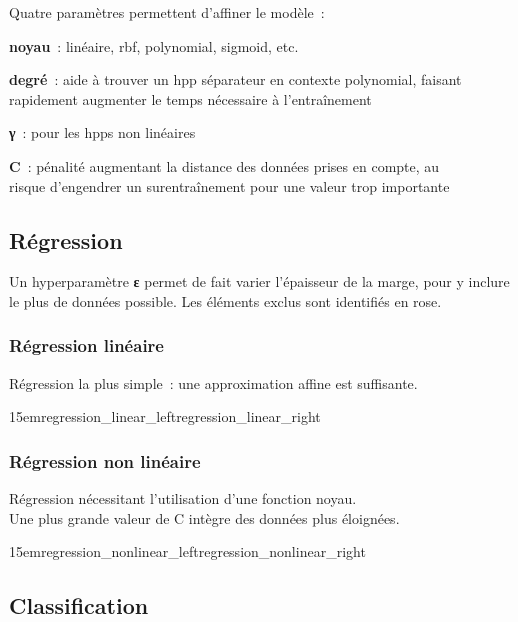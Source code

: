 Quatre paramètres permettent d’affiner le modèle :
\begin{itmz}
\item{\textbf{noyau} : linéaire, \gls{rbf}, polynomial, \gls{sigmoid}, etc.}
\item{\textbf{degré} : aide à trouver un \gls{hpp} séparateur en contexte polynomial,
faisant rapidement augmenter le temps nécessaire à l’entraînement}
\item{\textbf{γ} : pour les \glspl{hpp} non linéaires}
\item{\textbf{C} : pénalité augmentant la distance des données prises en compte, au\\
risque d’engendrer un surentraînement pour une valeur trop importante}
\end{itmz}

\pagebreak

\subsection{Régression}

Un hyperparamètre \textbf{ε} permet de fait varier l’épaisseur de la marge,
pour y inclure le plus de données possible.
Les éléments exclus sont identifiés en rose.

\subsubsection{Régression linéaire}

Régression la plus simple : une approximation affine est suffisante.

{15em}{regression_linear_left}{regression_linear_right}

\subsubsection{Régression non linéaire}

Régression nécessitant l’utilisation d’une fonction noyau.\\
Une plus grande valeur de C intègre des données plus éloignées.

{15em}{regression_nonlinear_left}{regression_nonlinear_right}

\pagebreak

\subsection{Classification}

